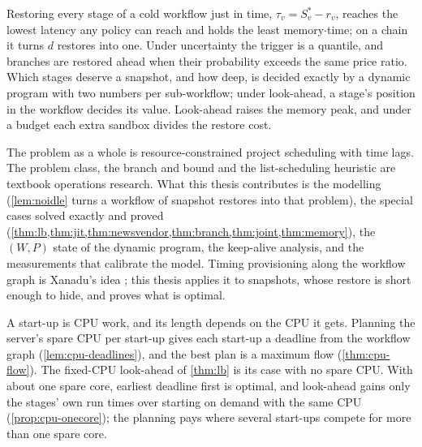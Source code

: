Restoring every stage of a cold workflow just in time, $\tau_v = S^*_v - r_v$, reaches the lowest
latency any policy can reach and holds the least memory$\cdot$time; on a chain it turns $d$
restores into one. Under uncertainty the trigger is a quantile, and branches are restored ahead
when their probability exceeds the same price ratio. Which stages deserve a snapshot, and how
deep, is decided exactly by a dynamic program with two numbers per sub-workflow; under
look-ahead, a stage's position in the workflow decides its value. Look-ahead raises the memory
peak, and under a budget each extra sandbox divides the restore cost.

The problem as a whole is resource-constrained project scheduling with time lags. The problem
class, the branch and bound and the list-scheduling heuristic are textbook operations research.
What this thesis contributes is the modelling (\cref{lem:noidle} turns a workflow of snapshot
restores into that problem), the special cases solved exactly and proved
(\cref{thm:lb,thm:jit,thm:newsvendor,thm:branch,thm:joint,thm:memory}), the $(W, P)$ state of the
dynamic program, the keep-alive analysis, and the measurements that calibrate the model.
Timing provisioning along the workflow graph is Xanadu's idea \cite{xanadu2020}; this thesis
applies it to snapshots, whose restore is short enough to hide, and proves what is optimal.

A start-up is CPU work, and its length depends on the CPU it gets. Planning the server's spare CPU
per start-up gives each start-up a deadline from the workflow graph (\cref{lem:cpu-deadlines}),
and the best plan is a maximum flow (\cref{thm:cpu-flow}). The fixed-CPU look-ahead of
\cref{thm:lb} is its case with no spare CPU. With about one spare core, earliest deadline first is
optimal, and look-ahead gains only the stages' own run times over starting on demand with the
same CPU (\cref{prop:cpu-onecore}); the planning pays where several start-ups compete for more
than one spare core.
